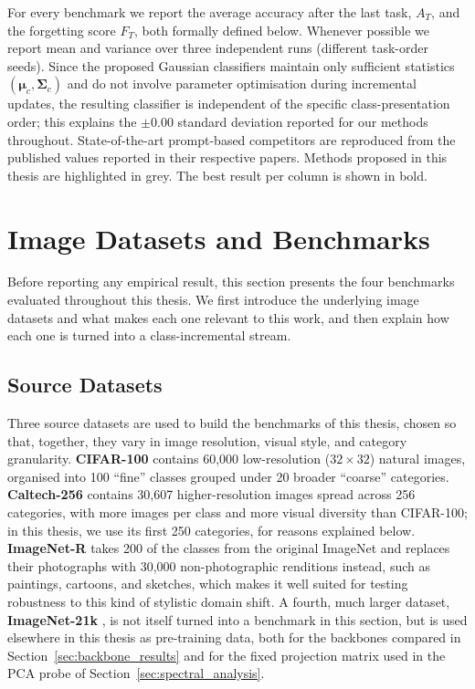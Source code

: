 For every benchmark we report the average accuracy after the last task, $A_{T}$, and the forgetting score $F_{T}$, both formally defined below. Whenever possible we report mean and variance over three independent runs (different task-order seeds). Since the proposed Gaussian classifiers maintain only sufficient statistics $(\boldsymbol{\mu}_c, \boldsymbol{\Sigma}_c)$ and do not involve parameter optimisation during incremental updates, the resulting classifier is independent of the specific class-presentation order; this explains the $\pm 0.00$ standard deviation reported for our methods throughout. State-of-the-art prompt-based competitors are reproduced from the published values reported in their respective papers. Methods proposed in this thesis are highlighted in grey. The best result per column is shown in bold.

\section{Image Datasets and Benchmarks}
\label{sec:an:datasets}

Before reporting any empirical result, this section presents the four benchmarks evaluated throughout this thesis. We first introduce the underlying image datasets and what makes each one relevant to this work, and then explain how each one is turned into a class-incremental stream.

\subsection{Source Datasets}
\label{sec:an:source_datasets}

Three source datasets are used to build the benchmarks of this thesis, chosen so that, together, they vary in image resolution, visual style, and category granularity. \textbf{CIFAR-100} \cite{cifar100} contains 60,000 low-resolution ($32\times32$) natural images, organised into 100 ``fine'' classes grouped under 20 broader ``coarse'' categories. \textbf{Caltech-256} \cite{caltech256} contains 30,607 higher-resolution images spread across 256 categories, with more images per class and more visual diversity than CIFAR-100; in this thesis, we use its first 250 categories, for reasons explained below. \textbf{ImageNet-R} \cite{imagenetR} takes 200 of the classes from the original ImageNet \cite{imagenet} and replaces their photographs with 30,000 non-photographic renditions instead, such as paintings, cartoons, and sketches, which makes it well suited for testing robustness to this kind of stylistic domain shift. A fourth, much larger dataset, \textbf{ImageNet-21k} \cite{imagenet21k}, is not itself turned into a benchmark in this section, but is used elsewhere in this thesis as pre-training data, both for the backbones compared in Section~\ref{sec:backbone_results} and for the fixed projection matrix used in the PCA probe of Section~\ref{sec:spectral_analysis}.

